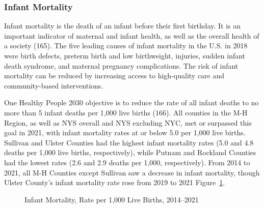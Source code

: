 \documentclass[
  english,
  letterpaper,
]{report}
\begin{document}
\subsubsection{Infant Mortality}\label{infant-mortality}

Infant mortality is the death of an infant before their first birthday.
It is an important indicator of maternal and infant health, as well as
the overall health of a society (165). The five leading causes of infant
mortality in the U.S. in 2018 were birth defects, preterm birth and low
birthweight, injuries, sudden infant death syndrome, and maternal
pregnancy complications. The risk of infant mortality can be reduced by
increasing access to high-quality care and community-based
interventions.

One Healthy People 2030 objective is to reduce the rate of all infant
deaths to no more than 5 infant deaths per 1,000 live births (166). All
counties in the M-H Region, as well as NYS overall and NYS excluding
NYC, met or surpassed this goal in 2021, with infant mortality rates at
or below 5.0 per 1,000 live births. Sullivan and Ulster Counties had the
highest infant mortality rates (5.0 and 4.8 deaths per 1,000 live
births, respectively), while Putnam and Rockland Counties had the lowest
rates (2.6 and 2.9 deaths per 1,000, respectively). From 2014 to 2021,
all M-H Counties except Sullivan saw a decrease in infant mortality,
though Ulster County's infant mortality rate rose from 2019 to 2021
Figure~\ref{fig-infant-mortal-rate}.

\begin{figure}


\caption{\label{fig-infant-mortal-rate}Infant Mortality, Rate per 1,000
Live Births, 2014--2021}

\end{figure}%
\end{document}
